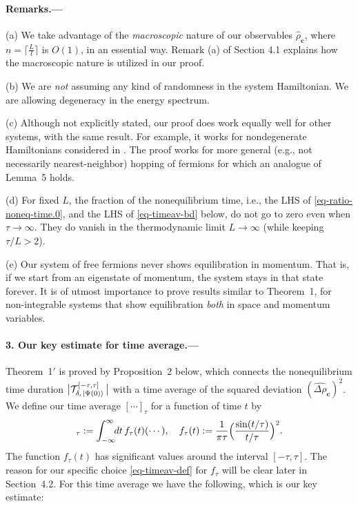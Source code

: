 \documentclass[aps,prl,superscriptaddress,reprint]{revtex4-2}
\newcommand{\se}[1]{\paragraph{#1.---}}
\theoremstyle{definition}
\newcommand{\TT}{{\cal T}}
\newcommand{\ket}[1]{\left|{#1}\right\rangle}
\newcommand{\wh}{\widehat}
\newcommand{\ta}{\tau}
\newcommand{\De}{\varDelta}
\renewcommand{\r}{\rho}
\newcommand{\f}{\frac}
\newcommand{\q}{\quad}
\newcommand{\ve}[1]{\boldsymbol{#1}}
\newcommand{\toinf}{\to\infty}
\newcommand{\intinf}{\int_{-\infty}^\infty}
\newcommand{\noneq}{nonequilibrium}
\begin{document}
\smallskip



\se{Remarks}


(a) We take advantage of the \emph{macroscopic} nature of our observables
$\hat \rho_{\ve c}$,
where $n= \lceil \tfrac{L}{l} \rceil$ is $O(1)$,  in an essential way.
Remark (a) of Section 4.1 explains how the macroscopic nature is
utilized in our proof.


(b) We are \emph{not} assuming any
kind of randomness in the system Hamiltonian.
We are allowing degeneracy in the energy spectrum.

(c)
Although not explicitly stated, our proof does
work equally well for other systems,
with the same result.
For example, it works for nondegenerate Hamiltonians considered
in \cite{Tasaki2024freeexpansion}.  The proof works for
more general (e.g., not necessarily nearest-neighbor)
hopping of fermions for which an analogue of Lemma~5 holds.


(d)
For fixed $L$, the fraction
of the nonequilibrium time, i.e., the LHS of
\eqref{eq-ratio-noneq-time.0},
and the LHS of \eqref{eq-timeav-bd} below, do not go to
zero even when $\tau\to \infty$.
They do vanish in the thermodynamic limit $L\toinf$
(while keeping $\ta/L>2$).

(e)
Our system of free fermions never shows equilibration in
momentum. That is, if we start from an eigenstate of momentum, the system stays in that
state forever.
It is of utmost importance to prove results similar to Theorem~1,
for non-integrable
systems that show equilibration \emph{both} in space and momentum
variables.

\medskip

\se{3. Our key estimate for time average}
Theorem~1$'$ is proved by Proposition~2 below,
which
connects the {\noneq} time duration
$\bigl | \TT^{[-\tau, \tau]}_{\delta, \,\ket{\Psi(0)}} \, \bigr |$
with a time average of the
squared deviation $(\wh{\De\r}_{\ve c})^2$.
We define our time average
$[\cdots]_\tau$
for a function of time $t$
by
\begin{align}
  	[\cdots]_\ta:=\intinf \!\!dt \, f_\ta(t) (\cdots) ,
  	\q f_\ta(t):=\f1{\pi\ta}
	\Bigl ( \f{\sin(t/\ta)}{t/\ta} \Bigr )^2.
  	\label{eq-timeav-def}
\end{align}
The function $f_\ta(t)$ has significant values around the interval
$[-\ta,\ta]$.
The reason for our specific choice \eqref{eq-timeav-def} for $f_\tau$ will
be clear later in Section~4.2.
For this time average we have the following, which is our key estimate:
\end{document}
